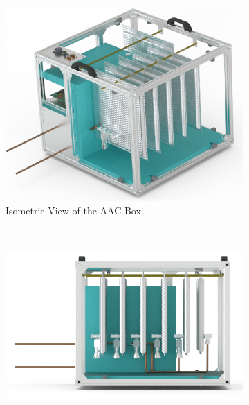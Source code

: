 \documentclass[a4paper,12pt,oneside]{article} %
\providecommand{\DIFaddbeginFL}{} %
\providecommand{\DIFaddendFL}{} %
\providecommand{\DIFdelbeginFL}{} %
\providecommand{\DIFdelendFL}{} %
\newcommand{\DIFscaledelfig}{0.5}
\newlength{\DIFdelgraphicswidth} %
\newlength{\DIFdelgraphicsheight} %
\newcommand{\DIFaddincludegraphics}[2][]{{\color{blue}\fbox{\DIFOincludegraphics[#1]{#2}}}} %
\newcommand{\DIFdelincludegraphics}[2][]{%
\sbox{\DIFdelgraphicsbox}{\DIFOincludegraphics[#1]{#2}}%
\settoboxwidth{\DIFdelgraphicswidth}{\DIFdelgraphicsbox} %
\settoboxtotalheight{\DIFdelgraphicsheight}{\DIFdelgraphicsbox} %
\scalebox{\DIFscaledelfig}{%
\parbox[b]{\DIFdelgraphicswidth}{\usebox{\DIFdelgraphicsbox}\\[-\baselineskip] \rule{\DIFdelgraphicswidth}{0em}}\llap{\resizebox{\DIFdelgraphicswidth}{\DIFdelgraphicsheight}{%
\setlength{\unitlength}{\DIFdelgraphicswidth}%
\begin{picture}(1,1)%
\thicklines\linethickness{2pt} %
{\color[rgb]{1,0,0}\put(0,0){\framebox(1,1){}}}%
{\color[rgb]{1,0,0}\put(0,0){\line( 1,1){1}}}%
{\color[rgb]{1,0,0}\put(0,1){\line(1,-1){1}}}%
\end{picture}%
}\hspace*{3pt}}} %
} %
\DeclareRobustCommand{\DIFaddbeginFL}{\DIFOaddbeginFL \let\includegraphics\DIFaddincludegraphics} %
\DeclareRobustCommand{\DIFaddendFL}{\DIFOaddendFL \let\includegraphics\DIFOincludegraphics} %
\DeclareRobustCommand{\DIFdelbeginFL}{\DIFOdelbeginFL \let\includegraphics\DIFdelincludegraphics} %
\DeclareRobustCommand{\DIFdelendFL}{\DIFOaddendFL \let\includegraphics\DIFOincludegraphics} %
\begin{document}



\begin{figure}[H]
    \centering
    \begin{subfigure}[b]{0.47\textwidth}
        \DIFdelbeginFL %
\DIFdelendFL \DIFaddbeginFL \includegraphics[width=\textwidth]{4-experiment-design/img/Mechanical/Figure_22a.png}
         \DIFaddendFL \caption{Isometric View of the AAC Box.}
    \label{iso_aac}
    \end{subfigure}
    ~
    \begin{subfigure}[b]{0.47\textwidth}
        \centering
         \DIFdelbeginFL %
\DIFdelendFL \DIFaddbeginFL \includegraphics[width=\textwidth]{4-experiment-design/img/Mechanical/Figure_22b.png}

\end{subfigure}
\end{figure}
\end{document}
